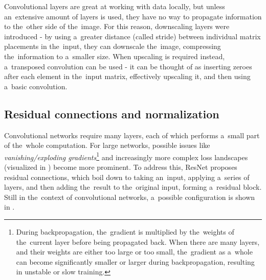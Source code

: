 

Convolutional layers are great at working with data locally, but unless an~extensive amount of layers is used, they have no way to propagate information to the~other side of the~image. For this reason, downscaling layers were introduced - by using a~greater distance (called stride) between individual matrix placements in the~input, they can downscale the~image, compressing the~information to a~smaller size. When upscaling is required instead, a~transposed convolution can be used - it can be thought of as inserting zeroes after each element in the~input matrix, effectively upscaling it, and then using a~basic convolution.



\subsection{Residual connections and normalization}

Convolutional networks require many layers, each of which performs a~small part of the~whole computation. For large networks, possible issues like \textit{vanishing/exploding gradients}\footnote{During backpropagation, the~gradient is multiplied by the~weights of the~current layer before being propagated back. When there are many layers, and their weights are either too large or too small, the~gradient as a~whole can become significantly smaller or larger during backpropagation, resulting in unstable or slow training.} and increasingly more complex loss landscapes (visualized in \citep{loss_landscape}) become more prominent. To address this, ResNet \citep{resnet} proposes residual connections, which boil down to taking an~input, applying a~series of layers, and then adding the~result to the~original input, forming a~residual block. Still in the~context of convolutional networks, a~possible configuration is shown in .



